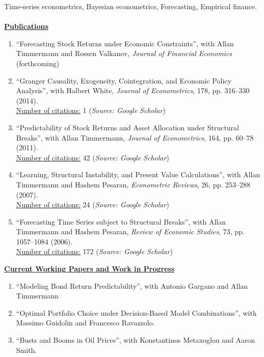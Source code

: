 \documentclass[12pt]{article}
\begin{document}
Time-series econometrics, Bayesian econometrics, Forecasting, Empirical finance.\\ \\
\underline{\textbf{Publications}}
\begin{enumerate}	
	\item ``Forecasting Stock Returns under Economic Constraints'', with Allan Timmermann and Rossen Valkanov, \emph{Journal of Financial Economics} (forthcoming)
	
	\item ``Granger Causality, Exogeneity, Cointegration, and Economic Policy Analysis'', with Halbert White, \emph{Journal of Econometrics}, 178, pp. 316--330 (2014). \\
	\underline{Number of citations:} 1 (\emph{Source: Google Scholar})
	
	\item ``Predictability of Stock Returns and Asset Allocation under Structural Breaks'', with Allan Timmermann, \emph{Journal of Econometrics}, 164, pp. 60--78 (2011). \\
	\underline{Number of citations:} 42 (\emph{Source: Google Scholar})
	
	\item ``Learning, Structural Instability, and Present Value Calculations'', with Allan Timmermann and Hashem Pesaran, \emph{Econometric Reviews}, 26, pp. 253--288 (2007). \\
	\underline{Number of citations:} 24 (\emph{Source: Google Scholar})

	\item ``Forecasting Time Series subject to Structural Breaks'', with Allan Timmermann and Hashem Pesaran, \emph{Review of Economic Studies}, 73, pp. 1057--1084 (2006). \\
	\underline{Number of citations:} 172 (\emph{Source: Google Scholar})

    \setcounter{enumTemp}{\theenumi}
 \end{enumerate}
\underline{\textbf{Current Working Papers and Work in Progress}}
\begin{enumerate}
	\setcounter{enumi}{\theenumTemp}
	\item ``Modeling Bond Return Predictability'', with Antonio Gargano and Allan Timmermann
	\item ``Optimal Portfolio Choice under Decision-Based Model Combinations'', with Massimo Guidolin and Francesco Ravazzolo.
	\item ``Busts and Booms in Oil Prices'', with Konstantinos Metaxoglou  and Aaron Smith.
\end{enumerate}
\end{document}
